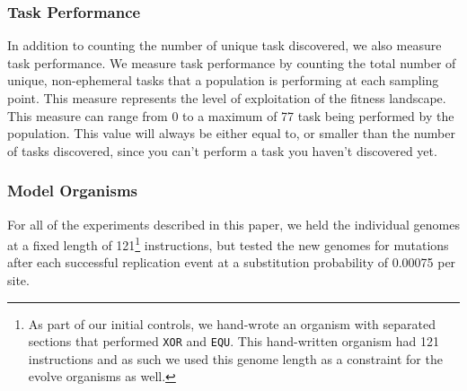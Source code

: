 \documentclass[10pt,letterpaper]{article}
\begin{document}
\subsubsection*{Task Performance}
In addition to counting the number of unique task discovered, we also measure task performance. We measure task performance by counting the total number of unique, non-ephemeral tasks that a population is performing at each sampling point. This measure represents the level of exploitation of the fitness landscape. This measure can range from 0 to a maximum of 77 task being performed by the population. This value will always be either equal to, or smaller than the number of tasks discovered, since you can't perform a task you haven't discovered yet.   

\subsubsection*{Model Organisms}
For all of the experiments described in this paper, we held the individual genomes at a fixed length of 121\footnote{As part of our initial controls, we hand-wrote an organism with separated sections that performed \texttt{XOR} and \texttt{EQU}. This hand-written organism had 121 instructions and as such we used this genome length as a constraint for the evolve organisms as well.} instructions, but tested the new genomes for mutations after each successful replication event at a substitution probability of 0.00075 per site. 
\end{document}
